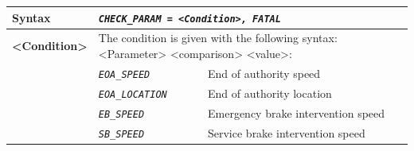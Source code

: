 \documentclass{template/openetcs}
\begin{document}
\begin{itemize}
\begin{longtable}{|l|l|l|}
			\hline
							
				\begin{minipage}[t]{0.22\linewidth} \textbf{Syntax}	\end{minipage}
			&	\multicolumn{2}{l|}{ \begin{minipage}[t]{0.78\linewidth} \emph{\texttt{CHECK\_PARAM = <Condition>, FATAL}} \end{minipage} } \\
			
			\hline
			
				\multirow{1}{*}{ \begin{minipage}[t]{0.22\linewidth} \textbf{<Condition>} \end{minipage} }
			&	\multicolumn{2}{l|}{ \begin{minipage}[t]{0.78\linewidth} The condition is given with the following syntax: <Parameter> <comparison> <value>: \end{minipage} } \\
			
			\hline
			 			 
			&	\begin{minipage}[t]{0.40\linewidth} \emph{\texttt{EOA\_SPEED}} \end{minipage}
			&	\begin{minipage}[t]{0.38\linewidth} End of authority speed \end{minipage} \\
			
			\hline
			
			&	\begin{minipage}[t]{0.40\linewidth} \emph{\texttt{EOA\_LOCATION}} \end{minipage}
			&	\begin{minipage}[t]{0.38\linewidth} End of authority location \end{minipage} \\
			
			\hline
			
			&	\begin{minipage}[t]{0.40\linewidth} \emph{\texttt{EB\_SPEED}} \end{minipage}
			&	\begin{minipage}[t]{0.38\linewidth} Emergency brake intervention speed \end{minipage} \\
			
			\hline
			
			&	\begin{minipage}[t]{0.40\linewidth} \emph{\texttt{SB\_SPEED}} \end{minipage}
			&	\begin{minipage}[t]{0.38\linewidth} Service brake intervention speed \end{minipage} \\
			

\end{longtable}
\end{itemize}
\end{document}
